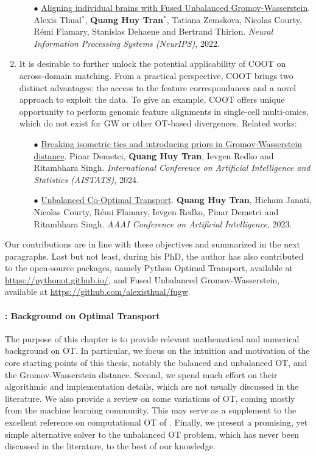 \begin{enumerate}
\begin{itemize}
        \item[$\bullet$] \underline{Aligning individual brains with Fused Unbalanced Gromov-Wasserstein}.
         Alexis Thual$^*$, \textbf{Quang Huy Tran$^*$}, Tatiana Zemskova, Nicolas Courty,
         Rémi Flamary, Stanislas Dehaene and  Bertrand Thirion.
         \textit{Neural Information Processing Systems (NeurIPS)}, 2022.
    \end{itemize}

    \item It is desirable to further unlock the potential applicability of COOT
    on across-domain matching. From a practical perspective, COOT brings two distinct advantages:
    the access to the feature correspondances and a novel approach to exploit the data.
    To give an example, COOT offers unique opportunity to perform genomic feature alignments
    in single-cell multi-omics, which do not exist for GW or other OT-based divergences. Related works:
    \begin{itemize}
        \item[$\bullet$] \underline{Breaking isometric ties and introducing priors in Gromov-Wasserstein distance}.
        Pinar Demetci, \textbf{Quang Huy Tran}, Ievgen Redko and Ritambhara Singh.
        \textit{International Conference on Artificial Intelligence and Statistics (AISTATS)}, 2024.

        \item[$\bullet$] \underline{Unbalanced Co-Optimal Transport}. \textbf{Quang Huy Tran}, Hicham Janati,
        Nicolas Courty, Rémi Flamary, Ievgen Redko, Pinar Demetci and Ritambhara Singh.
        \textit{AAAI Conference on Artificial Intelligence}, 2023.
    \end{itemize}
\end{enumerate}
Our contributions are in line with these objectives and summarized in the next paragraphs.
Last but not least, during his PhD, the author has also contributed to the open-source packages,
namely Python Optimal Transport, available at \url{https://pythonot.github.io/}, and
Fused Unbalanced Gromov-Wasserstein, available at \url{https://github.com/alexisthual/fugw}.

\paragraph{ : Background on Optimal Transport}

The purpose of this chapter is to provide relevant mathematical and numerical background
on OT. In particular, we focus on the intuition and motivation of the core starting points
of this thesis, notably the balanced and unbalanced OT, and the Gromov-Wasserstein distance.
Second, we spend much effort on their algorithmic and implementation details, which are not
usually discussed in the literature. We also provide a review on some variations of OT,
coming mostly from the machine learning community. This may serve as a supplement
to the excellent reference on computational OT of \citep{Peyre19}.
Finally, we present a promising, yet simple alternative solver to the unbalanced OT problem,
which has never been discussed in the literature, to the best of our knowledge.

